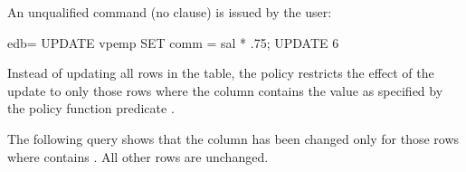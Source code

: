 \documentclass[letterpaper,10pt,english,openany,oneside]{sphinxmanual}
\begin{document}
An unqualified  command (no  clause) is issued by the
 user:

%
\begin{sphinxVerbatim}[commandchars=\\\{\}]
edb=\PYGZgt{} UPDATE vpemp SET comm = sal * .75;
UPDATE 6
\end{sphinxVerbatim}

Instead of updating all rows in the table, the policy restricts the
effect of the update to only those rows where the  column contains
the value  as specified by the policy function predicate .

The following query shows that the  column has been changed only for
those rows where  contains . All other rows are unchanged.
\end{document}
